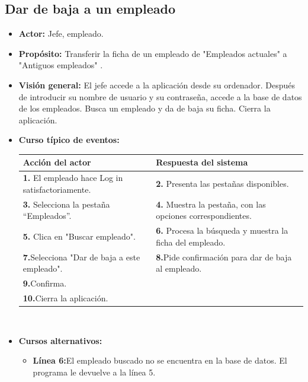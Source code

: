 \documentclass[spanish,a4paper,12pt]{report}	%
\begin{document}

	\subsection{Dar de baja a un empleado}	
			\begin{itemize}
			\item \textbf{Actor:} Jefe, empleado.
			\item \textbf{Propósito: } Transferir la ficha de un empleado de "Empleados actuales" a "Antiguos empleados" .
			\item \textbf{Visión general:} El jefe accede a la aplicación desde su ordenador. Después de introducir su nombre de usuario y su contraseña, accede a la base de datos de los empleados. Busca un empleado y da de baja su ficha. Cierra la aplicación. 
			\item \textbf{Curso típico de eventos:} 	\\
				\begin{tabular}{|p{6cm}||p{6cm}|}
				\hline
				\textbf{Acción del actor} & \textbf{Respuesta del sistema} \\ \hline \hline
				\textbf{1.}   El empleado hace Log in satisfactoriamente. & \textbf{2.} Presenta las pestañas disponibles.\\ \hline
				\textbf{3.} Selecciona la pestaña “Empleados”. & \textbf{4.} Muestra la pestaña, con las opciones correspondientes. \\ \hline
				\textbf{5.} Clica en "Buscar empleado".	& \textbf{6.} Procesa la búsqueda y muestra la ficha del empleado. \\ \hline
				\textbf{7.}Selecciona "Dar de baja a este empleado". & \textbf{8.}Pide confirmación para dar de baja al empleado.\\ \hline
				\textbf{9.}Confirma. & \textbf{} \\ \hline
				\textbf{10.}Cierra la aplicación. & \textbf{} \\ \hline
			\end{tabular}
			\\
			\item \textbf{Cursos alternativos:} 
			\begin{itemize}
			\item  \textbf{Línea 6:}El empleado buscado no se encuentra en la base de datos. El programa le devuelve a la línea 5.
			\end {itemize}
		\end{itemize}%
\end{document}
